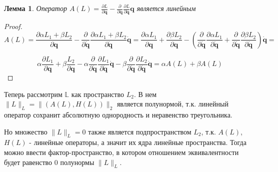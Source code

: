 \documentclass[a4paper, 12pt]{article}
\newtheorem{lemma}{Лемма}
\begin{document}
\begin{lemma} \label{lemma2}
Оператор $A (L) = \frac{\partial L}{\partial \mathbf{q}}-\frac{\partial}{\partial \dot{\mathbf{q}}} \frac{\partial L}{\partial \dot{\mathbf{q}}} \mathbf{q}$ является линейным
\end{lemma}
\begin{proof}
$$A (L) = \frac{\partial \alpha L_1 + \beta L_2}{\partial \mathbf{q}}-\frac{\partial}{\partial \dot{\mathbf{q}}} \frac{\partial \alpha L_1 + \beta L_2}{\partial \dot{\mathbf{q}}} \dot{\mathbf{q}} = 
\frac{\partial \alpha L_1}{\partial \mathbf{q}} + \frac{\partial\beta L_2}{\partial \mathbf{q}} - \left(\frac{\partial}{\partial \dot{\mathbf{q}}} \frac{\partial \alpha L_1}{\partial \dot{\mathbf{q}}} + \frac{\partial}{\partial \dot{\mathbf{q}}} \frac{\partial \beta L_2}{\partial \dot{\mathbf{q}}}\right) \dot{\mathbf{q}} = $$

$$\alpha\frac{\partial  L_1 }{\partial \mathbf{q}} + \beta\frac{L_2}{\partial \mathbf{q}} -  \alpha\frac{\partial}{\partial \dot{\mathbf{q}}} \frac{\partial L_1}{\partial \dot{\mathbf{q}}}\dot{\mathbf{q}} -  \beta\frac{\partial}{\partial \dot{\mathbf{q}}} \frac{\partial L_2}{\partial \dot{\mathbf{q}}} \dot{\mathbf{q}} = \alpha A(L) + \beta A(L)
$$
\end{proof}

Теперь рассмотрим $\mathbb{L}$ как пространство $L_2$. В нем $\|L\|_L = \|(A(L), H(L))\|_2$ является полунормой, т.к. линейный оператор сохранит абсолютную однородность и неравенство треугольника.

Но множество $\|L\|_L = 0$ также является подпространством $L_2$, т.к. $A(L)$, $H(L)$  - линейные операторы, а значит их ядра линейные пространства. Тогда можно ввести фактор-пространство, в котором отношением эквивалентности будет равенство 0 полунормы $\|L\|_L$.
\end{document}

